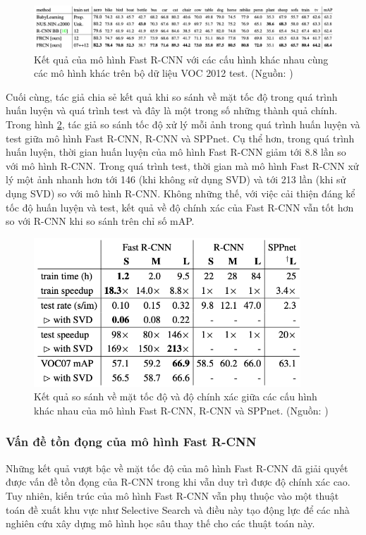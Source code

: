 {    \begin{figure}[H]
        \centering
        \includegraphics[width=15cm] {images/fast_rcnn_results_3}
        \caption{Kết quả của mô hình Fast R-CNN với các cấu hình khác nhau cùng các mô hình khác trên bộ dữ liệu VOC 2012 test. (Nguồn: \cite{girshick2015fast})}
        \label{fig:fast_rcnn_results_3}
    \end{figure}

    \noindent
    Cuối cùng, tác giả chia sẻ kết quả khi so sánh về mặt tốc độ trong quá trình huấn luyện và quá trình test và đây là một trong số những thành quả chính. \\
    Trong hình \ref{fig:fast_rcnn_results_4}, tác giả so sánh tốc độ xử lý mỗi ảnh trong quá trình huấn luyện và test giữa mô hình Fast R-CNN, R-CNN và SPPnet.
    Cụ thể hơn, trong quá trình huấn luyện, thời gian huấn luyện của mô hình Fast R-CNN giảm tới 8.8 lần so với mô hình R-CNN.
    Trong quá trình test, thời gian mà mô hình Fast R-CNN xử lý một ảnh nhanh hơn tới 146 (khi không sử dụng SVD) và tới 213 lần (khi sử dụng SVD) so với mô hình R-CNN.
    Không những thế, với việc cải thiện đáng kể tốc độ huấn luyện và test, kết quả về độ chính xác của Fast R-CNN vẫn tốt hơn so với R-CNN khi so sánh trên chỉ số mAP.

    \begin{figure}[H]
        \centering
        \includegraphics[width=10cm] {images/fast_rcnn_results_4}
        \caption{Kết quả so sánh về mặt tốc độ và độ chính xác giữa các cấu hình khác nhau của mô hình Fast R-CNN, R-CNN và SPPnet. (Nguồn: \cite{girshick2015fast})}
        \label{fig:fast_rcnn_results_4}
    \end{figure}

    \subsubsection*{Vấn đề tồn đọng của mô hình Fast R-CNN}
    Những kết quả vượt bậc về mặt tốc độ của mô hình Fast R-CNN đã giải quyết được vấn đề tồn đọng của R-CNN trong khi vẫn duy trì được độ chính xác cao.
    Tuy nhiên, kiến trúc của mô hình Fast R-CNN vẫn phụ thuộc vào một thuật toán đề xuất khu vực như Selective Search và điều này tạo động lực để các nhà nghiên cứu xây dựng mô hình học sâu thay thế cho các thuật toán này.
}